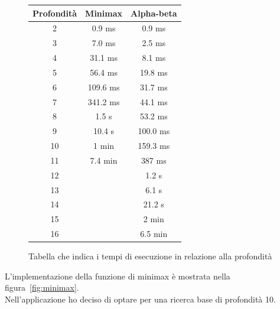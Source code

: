 \begin{figure}
    \begin{center}
        \begin{tabular}{||c c c||}
            \hline
            Profondità & Minimax & Alpha-beta\\ [0.5ex]
            \hline\hline
            2 & 0.9 ms & 0.9 ms \\
            \hline
            3 & 7.0 ms & 2.5 ms \\
            \hline
            4 & 31.1 ms & 8.1 ms \\
            \hline
            5 & 56.4 ms & 19.8 ms \\
            \hline
            6 & 109.6 ms & 31.7 ms \\
            \hline
            7 & 341.2 ms & 44.1 ms \\
            \hline
            8 & 1.5 s & 53.2 ms \\
            \hline
            9 & 10.4 s & 100.0 ms \\
            \hline
            10 & 1 min & 159.3 ms \\
            \hline
            11 & 7.4 min & 387 ms \\
            \hline
            12 & & 1.2 s \\
            \hline
            13 & & 6.1 s \\
            \hline
            14 & & 21.2 s \\
            \hline
            15 & & 2 min \\
            \hline
            16 & & 6.5 min \\ [1ex]
            \hline
        \end{tabular}
    \end{center}
    \caption{Tabella che indica i tempi di esecuzione in relazione alla profondità}
    \label{fig:benchmark}
\end{figure}

L'implementazione della funzione di minimax è mostrata nella figura~\ref{fig:minimax}. \\
Nell'applicazione ho deciso di optare per una ricerca base di profondità 10. \\

